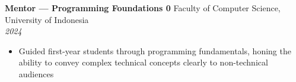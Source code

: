 \documentclass[10pt,a4paper]{article}
\newcommand{\experienceheader}[4]{
    \textbf{#1} \hfill #2 \\
    \textit{#3} \hfill \textit{#4}
}
\begin{document}
\vspace{2pt}

\experienceheader{Mentor --- Programming Foundations 0}{Faculty of Computer Science, University of Indonesia}{}{2024}
\begin{itemize}[leftmargin=*, itemsep=0.5pt, topsep=1pt]
    \item Guided first-year students through programming fundamentals, honing the ability to convey complex technical concepts clearly to non-technical audiences
\end{itemize}
\end{document}

